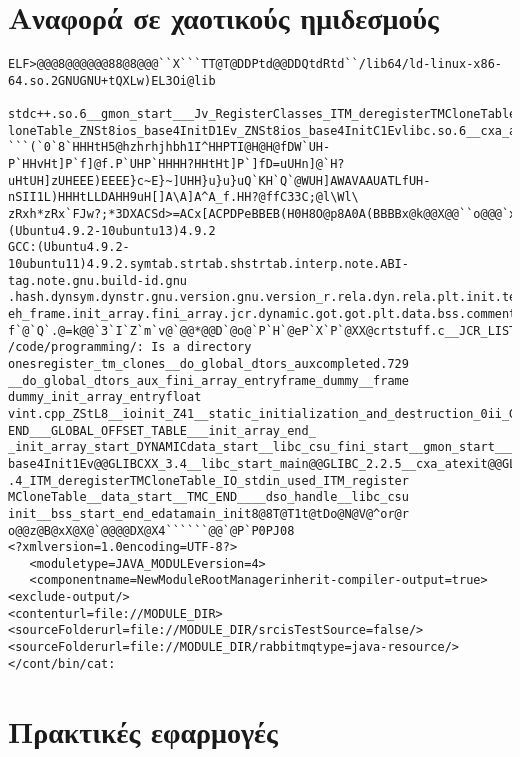 \documentclass[11pt,a4paper,notitlepage,fleqn]{article}
\begin{document}
\section{Αναφορά σε χαοτικούς ημιδεσμούς}
\begin{verbatim}
ELF>@@@8@@@@@@88@8@@@``X```TT@T@DDPtd@@DDQtdRtd``/lib64/ld-linux-x86-64.so.2GNUGNU+tQXLw)EL3Oi@lib

stdc++.so.6__gmon_start___Jv_RegisterClasses_ITM_deregisterTMCloneTable_ITM_registerTMC
loneTable_ZNSt8ios_base4InitD1Ev_ZNSt8ios_base4InitC1Evlibc.so.6__cxa_atexit__libc_start_mainGLIBC_2.2.5GLIBCXX_3.4uit)
```(`0`8`HHHtH5@hzhrhjhbh1I^HHPTI@H@H@fDW`UH-P`HHvHt]P`f]@f.P`UHP`HHHH?HHtHt]P`]fD=uUHn]@`H?uHtUH]zUHEEE)EEEE}c~E}~]UHH}u}u}uQ`KH`Q`@WUH]AWAVAAUATLfUH-nSII1L)HHHtLLDAHH9uH[]A\A]A^A_f.HH?@ffC33C;@l\Wl\
zRxh*zRx`FJw?;*3DXACSd>=ACx[ACPDPeBBEB(H0H8O@p8A0A(BBBBx@k@@X@@``o@@@`x@@o@oor@`@@@@@GCC:(Ubuntu4.9.2-10ubuntu13)4.9.2
GCC:(Ubuntu4.9.2-10ubuntu11)4.9.2.symtab.strtab.shstrtab.interp.note.ABI-tag.note.gnu.build-id.gnu
.hash.dynsym.dynstr.gnu.version.gnu.version_r.rela.dyn.rela.plt.init.text.fini.rodata.eh_frame_hdr
eh_frame.init_array.fini_array.jcr.dynamic.got.got.plt.data.bss.comment8@T@t@@@@r@@@@X@@@@@@X@``````@`P``@.P@A@WP`
f`@`Q`.@=k@@`3`I`Z`m`v@`@@*@@D`@o@`P`H`@eP`X`P`@XX@crtstuff.c__JCR_LIST__deregister_tm_cl/bin/cat: /code/programming/: Is a directory
onesregister_tm_clones__do_global_dtors_auxcompleted.729
__do_global_dtors_aux_fini_array_entryframe_dummy__frame
dummy_init_array_entryfloat
vint.cpp_ZStL8__ioinit_Z41__static_initialization_and_destruction_0ii_GLOBAL__sub_I_main__FRAME_END____JCR
END___GLOBAL_OFFSET_TABLE___init_array_end_
_init_array_start_DYNAMICdata_start__libc_csu_fini_start__gmon_start___Jv_RegisterClasses_fini_ZNSt8ios
base4Init1Ev@@GLIBCXX_3.4__libc_start_main@@GLIBC_2.2.5__cxa_atexit@@GLIBC_2.2.5_ZNSt8ios_base4InitD1Ev@@GLIBCXX_
.4_ITM_deregisterTMCloneTable_IO_stdin_used_ITM_register
MCloneTable__data_start__TMC_END____dso_handle__libc_csu
init__bss_start_end_edatamain_init8@8T@T1t@tDo@N@V@^or@r
o@@z@B@xX@X@`@@@@DX@X4``````@@`@P`P0PJ08
<?xmlversion=1.0encoding=UTF-8?>
   <moduletype=JAVA_MODULEversion=4>
   <componentname=NewModuleRootManagerinherit-compiler-output=true>
<exclude-output/>
<contenturl=file://MODULE_DIR>
<sourceFolderurl=file://MODULE_DIR/srcisTestSource=false/><sourceFolderurl=file://MODULE_DIR/rabbitmqtype=java-resource/></cont/bin/cat:
\end{verbatim}


\section{Πρακτικές εφαρμογές}
\end{document}
